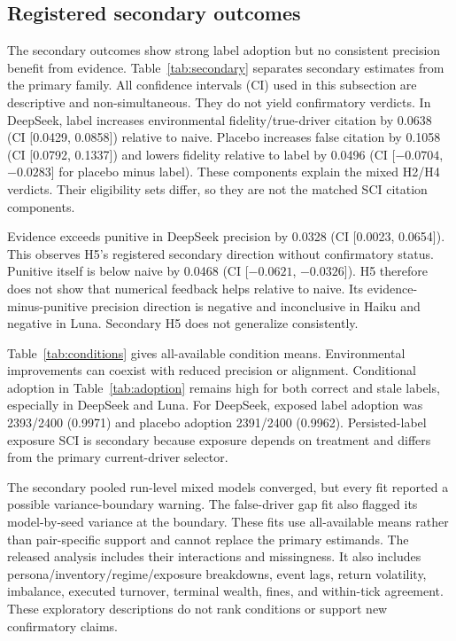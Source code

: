 \documentclass[a4paper]{article}
\begin{document}
\subsection{Registered secondary outcomes}\label{sec:secondary}
The secondary outcomes show strong label adoption but no consistent precision benefit from evidence. Table~\ref{tab:secondary} separates secondary estimates from the primary family. All confidence intervals (CI) used in this subsection are descriptive and non-simultaneous. They do not yield confirmatory verdicts. In DeepSeek, label increases environmental fidelity/true-driver citation by 0.0638 (CI [0.0429, 0.0858]) relative to naive. Placebo increases false citation by 0.1058 (CI [0.0792, 0.1337]) and lowers fidelity relative to label by 0.0496 (CI [$-0.0704$, $-0.0283$] for placebo minus label). These components explain the mixed H2/H4 verdicts. Their eligibility sets differ, so they are not the matched SCI citation components.

Evidence exceeds punitive in DeepSeek precision by 0.0328 (CI [0.0023, 0.0654]). This observes H5's registered secondary direction without confirmatory status. Punitive itself is below naive by 0.0468 (CI [$-0.0621$, $-0.0326$]). H5 therefore does not show that numerical feedback helps relative to naive. Its evidence-minus-punitive precision direction is negative and inconclusive in Haiku and negative in Luna. Secondary H5 does not generalize consistently.




Table~\ref{tab:conditions} gives all-available condition means. Environmental improvements can coexist with reduced precision or alignment. Conditional adoption in Table~\ref{tab:adoption} remains high for both correct and stale labels, especially in DeepSeek and Luna. For DeepSeek, exposed label adoption was 2393/2400 (0.9971) and placebo adoption 2391/2400 (0.9962). Persisted-label exposure SCI is secondary because exposure depends on treatment and differs from the primary current-driver selector.



The secondary pooled run-level mixed models converged, but every fit reported a possible variance-boundary warning. The false-driver gap fit also flagged its model-by-seed variance at the boundary. These fits use all-available means rather than pair-specific support and cannot replace the primary estimands. The released analysis includes their interactions and missingness. It also includes persona/inventory/regime/exposure breakdowns, event lags, return volatility, imbalance, executed turnover, terminal wealth, fines, and within-tick agreement. These exploratory descriptions do not rank conditions or support new confirmatory claims.
\end{document}
